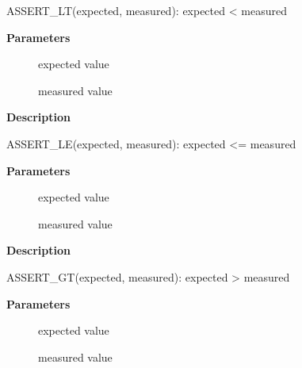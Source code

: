 \documentclass[a4paper,8pt,english]{sphinxmanual}
\begin{document}
ASSERT\_LT(expected, measured): expected \textless{} measured

\begin{fulllineitems}
\label{dev-tools/kselftest:c.ASSERT_LE}
\end{fulllineitems}


\textbf{Parameters}
\begin{description}
\item[{}] \leavevmode
expected value

\item[{}] \leavevmode
measured value

\end{description}

\textbf{Description}

ASSERT\_LE(expected, measured): expected \textless{}= measured

\begin{fulllineitems}
\label{dev-tools/kselftest:c.ASSERT_GT}
\end{fulllineitems}


\textbf{Parameters}
\begin{description}
\item[{}] \leavevmode
expected value

\item[{}] \leavevmode
measured value

\end{description}

\textbf{Description}

ASSERT\_GT(expected, measured): expected \textgreater{} measured

\begin{fulllineitems}
\label{dev-tools/kselftest:c.ASSERT_GE}
\end{fulllineitems}


\textbf{Parameters}
\begin{description}
\item[{}] \leavevmode
expected value

\item[{}] \leavevmode
measured value

\end{description}
\end{document}
